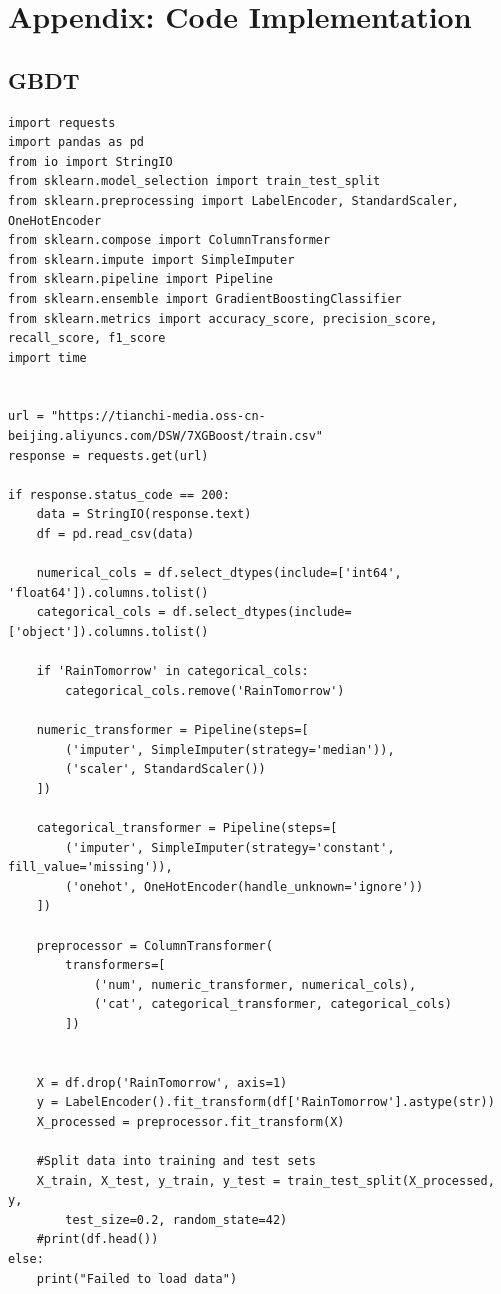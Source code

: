\documentclass[12pt]{article}
\begin{document}
\section*{Appendix: Code Implementation}
\subsection*{GBDT}
\begin{verbatim}
import requests
import pandas as pd
from io import StringIO
from sklearn.model_selection import train_test_split
from sklearn.preprocessing import LabelEncoder, StandardScaler, OneHotEncoder
from sklearn.compose import ColumnTransformer
from sklearn.impute import SimpleImputer
from sklearn.pipeline import Pipeline
from sklearn.ensemble import GradientBoostingClassifier
from sklearn.metrics import accuracy_score, precision_score, recall_score, f1_score
import time


url = "https://tianchi-media.oss-cn-beijing.aliyuncs.com/DSW/7XGBoost/train.csv"
response = requests.get(url)

if response.status_code == 200:
    data = StringIO(response.text)
    df = pd.read_csv(data)
    
    numerical_cols = df.select_dtypes(include=['int64', 'float64']).columns.tolist()
    categorical_cols = df.select_dtypes(include=['object']).columns.tolist()
  
    if 'RainTomorrow' in categorical_cols:
        categorical_cols.remove('RainTomorrow')

    numeric_transformer = Pipeline(steps=[
        ('imputer', SimpleImputer(strategy='median')),
        ('scaler', StandardScaler())
    ])

    categorical_transformer = Pipeline(steps=[
        ('imputer', SimpleImputer(strategy='constant', fill_value='missing')),
        ('onehot', OneHotEncoder(handle_unknown='ignore'))
    ])

    preprocessor = ColumnTransformer(
        transformers=[
            ('num', numeric_transformer, numerical_cols),
            ('cat', categorical_transformer, categorical_cols)
        ])
    

    X = df.drop('RainTomorrow', axis=1)
    y = LabelEncoder().fit_transform(df['RainTomorrow'].astype(str))
    X_processed = preprocessor.fit_transform(X)
    
    #Split data into training and test sets
    X_train, X_test, y_train, y_test = train_test_split(X_processed, y,
        test_size=0.2, random_state=42)
    #print(df.head())
else:
    print("Failed to load data")


\end{verbatim}
\end{document}
